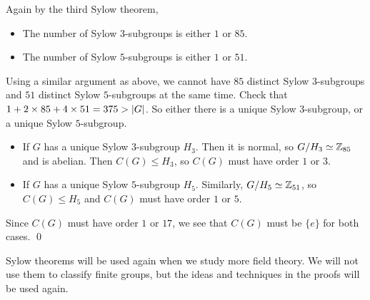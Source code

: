 Again by the third Sylow theorem,
\begin{itemize}
    \item The number of Sylow \(3\)-subgroups is either \(1\) or \(85\).
    \item The number of Sylow \(5\)-subgroups is either \(1\) or \(51\).
\end{itemize}
Using a similar argument as above, we cannot have \(85\) distinct Sylow \(3\)-subgroups and \(51\) distinct Sylow \(5\)-subgroups at the same time. Check that \(1 + 2 \times 85 + 4 \times 51 = 375 > \left| G \right|\). So either there is a unique Sylow \(3\)-subgroup, or a unique Sylow \(5\)-subgroup.
\begin{itemize}
    \item If \(G\) has a unique Sylow \(3\)-subgroup \(H_3\). Then it is normal, so \(G/H_3 \simeq \mathbb{Z}_{85}\) and is abelian. Then \(C(G) \leq H_3\), so \(C(G)\) must have order \(1\) or \(3\).

    \item If \(G\) has a unique Sylow \(5\)-subgroup \(H_5\). Similarly, \(G/H_5 \simeq \mathbb{Z}_{51}\), so \(C(G) \leq H_5\) and \(C(G)\) must have order \(1\) or \(5\).
\end{itemize}
Since \(C(G)\) must have order \(1\) or \(17\), we see that \(C(G)\) must be \(\{e\}\) for both cases. \qed

Sylow theorems will be used again when we study more field theory. We will not use them to classify finite groups, but the ideas and techniques in the proofs will be used again.

\pagebreak
